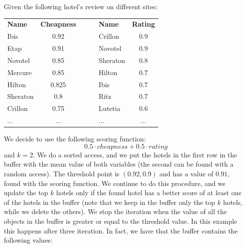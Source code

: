 \documentclass[12pt, a4paper]{report}
\newtheorem[style=M,bodystyle=\normalfont]{theorem}{Theorem}
\newtheorem[style=M,bodystyle=\normalfont]{corollary}{Corollary}
\newtheorem[style=M,bodystyle=\normalfont]{lemma}{Lemma}
\newtheorem[style=M,bodystyle=\normalfont]{definition}{Definition}
\begin{document}
    \begin{example}
        Given the following hotel's review on different sites: 
        \begin{table}[H]
            \centering
            \begin{tabular}{|lc|c|lc|}
            \cline{1-2} \cline{4-5}
            \textbf{Name} & \textbf{Cheapness} & $\:\:\:\:\:\:$ & \textbf{Name} & \textbf{Rating} \\ \cline{1-2} \cline{4-5} 
            Ibis          & 0.92               &                & Crillon       & 0.9             \\ 
            Etap          & 0.91               &                & Novotel       & 0.9             \\ 
            Novotel       & 0.85               &                & Sheraton      & 0.8             \\ 
            Mercure       & 0.85               &                & Hilton        & 0.7             \\ 
            Hilton        & 0.825              &                & Ibis          & 0.7             \\ 
            Sheraton      & 0.8                &                & Ritz          & 0.7             \\ 
            Crillon       & 0.75               &                & Lutetia       & 0.6             \\ 
            $\dots$       & $\dots$            &                & $\dots$       & $\dots$         \\ \cline{1-2} \cline{4-5} 
            \end{tabular}
        \end{table}
        We decide to use the following scoring function: 
        \[0.5 \cdot cheapness+0.5 \cdot rating\]
        and $k=2$. We do a sorted access, and we put the hotels in the first row in the buffer with the mean value of both variables (the 
        second can be found with a random access). The threshold point is $(0.92,0.9)$ and has a value of $0.91$, found with the scoring 
        function. We continue to do this procedure, and we update the top $k$ hotels only if the found hotel has a better score of at least
        one of the hotels in the buffer (note that we keep in the buffer only the top $k$ hotels, while we delete the others). 
        We stop the iteration when the value of all the objects in the buffer is greater or equal to the threshold value. In this example this
        happens after three iteration. In fact, we have that the buffer contains the following values: 

\end{example}
\end{document}
